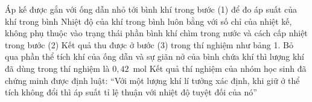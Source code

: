 \begin{ex}
		\choiceTFt
		{\True Áp kế được gắn với ống dẫn nhỏ tới bình khí trong bước (1) để đo áp suất của khí trong bình}
		{Nhiệt độ của khí trong bình luôn bằng với số chỉ của nhiệt kế, không phụ thuộc vào trạng thái phần bình khí chìm trong nước và cách cấp nhiệt trong bước (2)}
		{Kết quả thu được ở bước (3) trong thí nghiệm như bảng 1. Bỏ qua phần thể tích khí của ống dẫn và sự giãn nở của bình chứa khí thì lượng khí đã dùng trong thí nghiệm là $0{,}42$~mol}
		{\True Kết quả thí nghiệm của nhóm học sinh đã chứng minh được định luật: ``Với một lượng khí lí tưởng xác định, khi giữ ở thể tích không đổi thì áp suất tỉ lệ thuận với nhiệt độ tuyệt đối của nó''}
	\end{ex}

